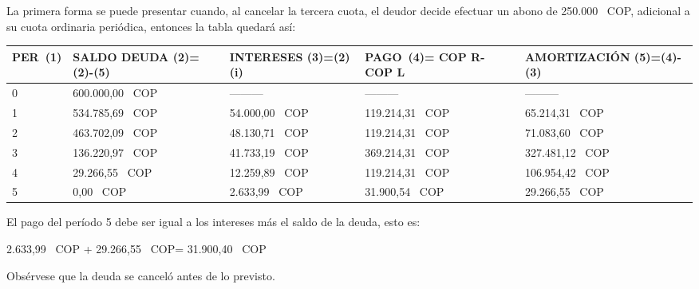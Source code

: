 La primera forma se puede presentar cuando, al cancelar la tercera cuota, el deudor decide efectuar un abono de    250.000 \ COP, adicional a su cuota ordinaria periódica, entonces la tabla quedará así:
\begin{spacing}{1.1}
	\begin{center}
		\begin{tabular}{|p{1cm}|p{2cm}|p{2cm}|p{2cm}|p{3cm}|}
			\hline
			\textbf{PER\ (1)} & \textbf{SALDO DEUDA (2)=(2)-(5)} & \textbf{INTERESES  (3)=(2)(i)} & \textbf{PAGO\ (4)= COP  R- COP  L } & \textbf{AMORTIZACIÓN  (5)=(4)-(3)} \\ \hline
			
			0                 &  600.000,00 \ COP                     & ---------                       & ---------                   & ---------                          \\ \hline
			1                 &  534.785,69 \ COP                     &  54.000,00 \ COP                    &  119.214,31 \ COP                &  65.214,31 \ COP                        \\ \hline
			2                 &  463.702,09 \ COP                     &  48.130,71 \ COP                    &  119.214,31 \ COP                &  71.083,60 \ COP                        \\ \hline
			3                 &  136.220,97 \ COP                     &  41.733,19 \ COP                     &  369.214,31 \ COP                &  327.481,12 \ COP                       \\ \hline
			4                 &  29.266,55 \ COP                      &  12.259,89 \ COP                     &  119.214,31 \ COP                &  106.954,42 \ COP                       \\ \hline
			5                 &  0,00 \ COP                           &  2.633,99 \ COP                      &  31.900,54 \ COP                 &  29.266,55 \ COP                        \\ \hline
		\end{tabular}
	\end{center}
\end{spacing}

El pago del período 5 debe ser igual a los intereses más el saldo de la deuda, esto es:
\begin{center}
	 2.633,99 \ COP +  29.266,55 \ COP=  31.900,40 \ COP
\end{center}
Obsérvese que la deuda se canceló antes de lo previsto.\\

